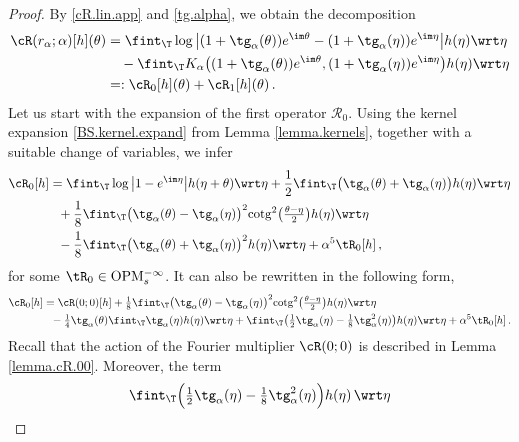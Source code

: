 \documentclass[a4paper,reqno,10pt]{article}
\newcommand{\OpM}{{\rm O}{\rm P}{\rm M}}
\begin{document}
\begin{proof}
    By \eqref{cR.lin.app} and \eqref{tg.alpha}, we obtain the decomposition
		\begin{align}\label{Split-R0-1}
				\nonumber\cR(r_\alpha;\alpha) [h](\theta)  & =  \fint_{\T} \log\big| (1+\tg_{\alpha}(\theta))e^{\im\theta} - (1+\tg_{\alpha}(\eta))e^{\im\eta}  \big| h(\eta) \wrt\eta \\
			\nonumber	& \quad -  \fint_{\T} K_\alpha \big( (1+\tg_{\alpha}(\theta))e^{\im\theta} , (1+\tg_{\alpha}(\eta)) e^{\im\eta} \big) h(\eta) \wrt\eta \\
				& =: \cR_{0} [h](\theta) + \cR_{1} [h](\theta) \,.
  		\end{align}
    Let us start with the expansion of the first operator \(\mathcal{R}_0\). Using the kernel expansion \eqref{BS.kernel.expand} from Lemma \ref{lemma.kernels}, together with a suitable change of variables, we infer
		\begin{align*}
			\cR_{0} [h] 
			& =  \fint_{\T} \log\big|1 - e^{\im\eta}  \big| h(\eta+\theta) \wrt\eta   + \frac{1}{2} \fint_{\T} \big( \tg_{\alpha}(\theta) + \tg_{\alpha}(\eta) \big) h(\eta) \wrt\eta \\
			& \ \ + \frac{1}{8} \fint_{\T} \big( \tg_{\alpha}(\theta)- \tg_{\alpha}(\eta) \big)^2 {\rm cotg}^2\big(\tfrac{\theta-\eta}{2}\big) h(\eta) \wrt\eta\\
            &\ \ - \frac{1}{8} \fint_{\T} \big( \tg_{\alpha}(\theta)+ \tg_{\alpha}(\eta) \big)^2 h(\eta) \wrt\eta     + \alpha^5 \tR_{0}[h] \,,
		\end{align*}
        for some $\tR_{0}\in\OpM_{s}^{-\infty}$. It can also be rewritten in the following form,
        \begin{align}
			\cR_{0} [h]
			& = \cR(0;0) [h]  + \tfrac{1}{8} \fint_{\T} \big( \tg_{\alpha}(\theta)- \tg_{\alpha}(\eta) \big)^2 {\rm cotg}^2\big(\tfrac{\theta-\eta}{2}\big) h(\eta) \wrt\eta \\
            & \ \ - \tfrac{1}{4} \tg_{\alpha}(\theta)\fint_{\T} \tg_{\alpha}(\eta)h(\eta) \wrt\eta+ \fint_{\T}\big( \tfrac12 \tg_{\alpha}(\eta)- \tfrac18 \tg_{\alpha}^2(\eta) \big) h(\eta) \wrt\eta + \alpha^5 \tR_{0}[h]\,.\label{polase.R0}
		\end{align}
	Recall that the action of the Fourier multiplier $\cR(0;0)$ is described in Lemma \ref{lemma.cR.00}. 
    Moreover, the term
\[
\fint_{\T}\Big( \tfrac12 \tg_{\alpha}(\eta)- \tfrac18 \tg_{\alpha}^2(\eta) \Big) h(\eta)\,\wrt\eta
\]
\end{proof}
\end{document}
